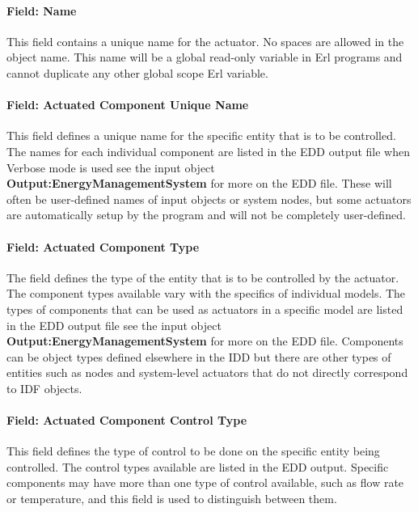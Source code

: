 \paragraph{Field: Name}\label{field-name-2-014}

This field contains a unique name for the actuator. No spaces are allowed in the object name. This name will be a global read-only variable in Erl programs and cannot duplicate any other global scope Erl variable.

\paragraph{Field: Actuated Component Unique Name}\label{field-actuated-component-unique-name-000}

This field defines a unique name for the specific entity that is to be controlled. The names for each individual component are listed in the EDD output file when Verbose mode is used see the input object \textbf{Output:EnergyManagementSystem} for more on the EDD file. These will often be user-defined names of input objects or system nodes, but some actuators are automatically setup by the program and will not be completely user-defined.

\paragraph{Field: Actuated Component Type}\label{field-actuated-component-type-000}

The field defines the type of the entity that is to be controlled by the actuator. The component types available vary with the specifics of individual models. The types of components that can be used as actuators in a specific model are listed in the EDD output file see the input object \textbf{Output:EnergyManagementSystem} for more on the EDD file. Components can be object types defined elsewhere in the IDD but there are other types of entities such as nodes and system-level actuators that do not directly correspond to IDF objects.

\paragraph{Field: Actuated Component Control Type}\label{field-actuated-component-control-type-000}

This field defines the type of control to be done on the specific entity being controlled. The control types available are listed in the EDD output. Specific components may have more than one type of control available, such as flow rate or temperature, and this field is used to distinguish between them.

